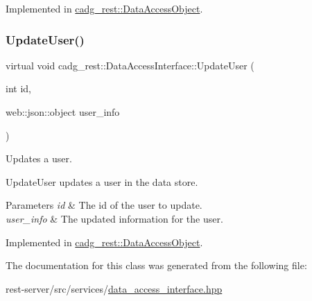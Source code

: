 Implemented in \mbox{\hyperlink{classcadg__rest_1_1_data_access_object_a9f5981fb13220932808b46fee7b55398}{cadg\+\_\+rest\+::\+Data\+Access\+Object}}.

\mbox{\label{classcadg__rest_1_1_data_access_interface_ae44f7d277f8b8982869109e66333949a}} 
\subsubsection{\texorpdfstring{UpdateUser()}{UpdateUser()}}
{\footnotesize\ttfamily virtual void cadg\+\_\+rest\+::\+Data\+Access\+Interface\+::\+Update\+User (\begin{DoxyParamCaption}\item[{int}]{id,  }\item[{web\+::json\+::object}]{user\+\_\+info }\end{DoxyParamCaption})\hspace{0.3cm}{\ttfamily [pure virtual]}}



Updates a user. 

Update\+User updates a user in the data store.


\begin{DoxyParams}{Parameters}
{\em id} & The id of the user to update. \\
\hline
{\em user\+\_\+info} & The updated information for the user. \\
\hline
\end{DoxyParams}


Implemented in \mbox{\hyperlink{classcadg__rest_1_1_data_access_object_af9a88b06de9cd2c7042c91be83e00872}{cadg\+\_\+rest\+::\+Data\+Access\+Object}}.



The documentation for this class was generated from the following file\+:\begin{DoxyCompactItemize}
\item 
rest-\/server/src/services/\mbox{\hyperlink{data__access__interface_8hpp}{data\+\_\+access\+\_\+interface.\+hpp}}\end{DoxyCompactItemize}
